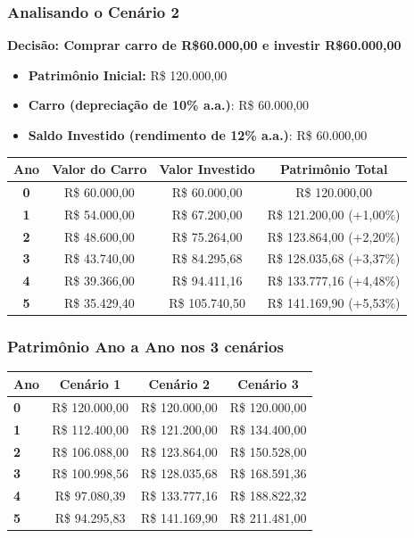 \begin{frame}[c]\frametitle{Analisando o Cenário 2}
  \textbf{Decisão: Comprar carro de R\$60.000,00 e investir R\$60.000,00}
  \begin{itemize}
    \item \textbf{Patrimônio Inicial:} R\$ 120.000,00
    \item \textbf{Carro (depreciação de 10\% a.a.)}: R\$ 60.000,00
    \item \textbf{Saldo Investido (rendimento de 12\% a.a.)}: R\$ 60.000,00
  \end{itemize}
  \begin{center}
    \begin{tabular}{|c|c|c|c|}
      \hline
      \textbf{Ano} & \textbf{Valor do Carro} & \textbf{Valor Investido} & \textbf{Patrimônio Total} \\
      \hline
      \textbf{0}   & R\$ 60.000,00           & R\$ 60.000,00            & R\$ 120.000,00            \\
      \textbf{1}   & R\$ 54.000,00           & R\$ 67.200,00            & R\$ 121.200,00 (+1,00\%)  \\
      \textbf{2}   & R\$ 48.600,00           & R\$ 75.264,00            & R\$ 123.864,00 (+2,20\%)  \\
      \textbf{3}   & R\$ 43.740,00           & R\$ 84.295,68            & R\$ 128.035,68 (+3,37\%)  \\
      \textbf{4}   & R\$ 39.366,00           & R\$ 94.411,16            & R\$ 133.777,16 (+4,48\%)  \\
      \textbf{5}   & R\$ 35.429,40           & R\$ 105.740,50           & R\$ 141.169,90 (+5,53\%)  \\
      \hline
    \end{tabular}
  \end{center}
\end{frame}

\begin{frame}[c]\frametitle{Patrimônio Ano a Ano nos 3 cenários}
  \begin{center}
    \begin{tabular}{|l|c|c|c|}
      \hline
      \textbf{Ano} & \textbf{Cenário 1} & \textbf{Cenário 2} & \textbf{Cenário 3} \\
      \hline
      \textbf{0}   & R\$ 120.000,00     & R\$ 120.000,00     & R\$ 120.000,00     \\
      \textbf{1}   & R\$ 112.400,00     & R\$ 121.200,00     & R\$ 134.400,00     \\
      \textbf{2}   & R\$ 106.088,00     & R\$ 123.864,00     & R\$ 150.528,00     \\
      \textbf{3}   & R\$ 100.998,56     & R\$ 128.035,68     & R\$ 168.591,36     \\
      \textbf{4}   & R\$ 97.080,39      & R\$ 133.777,16     & R\$ 188.822,32     \\
      \textbf{5}   & R\$ 94.295,83      & R\$ 141.169,90     & R\$ 211.481,00     \\
      \hline
    \end{tabular}
  \end{center}
\end{frame}


